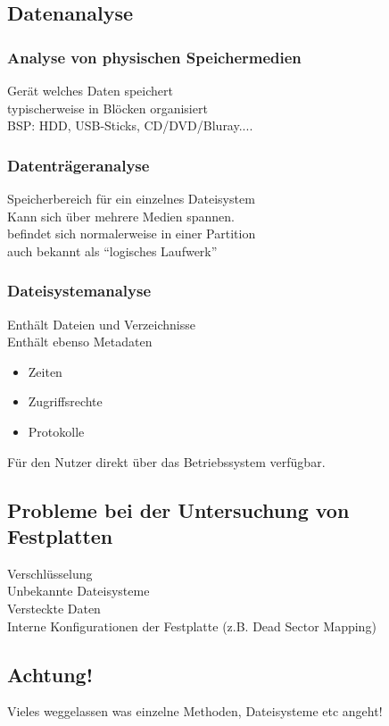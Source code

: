 \documentclass{article} %
\begin{document}
\subsection{Datenanalyse}
\subsubsection{Analyse von physischen Speichermedien}
Gerät welches Daten speichert\\
typischerweise in Blöcken organisiert\\
BSP: HDD, USB-Sticks, CD/DVD/Bluray....
\subsubsection{Datenträgeranalyse}
Speicherbereich für ein einzelnes Dateisystem\\
Kann sich über mehrere Medien spannen.\\
befindet sich normalerweise in einer Partition\\
auch bekannt als "`logisches Laufwerk"'
\subsubsection{Dateisystemanalyse}
Enthält Dateien und Verzeichnisse\\
Enthält ebenso Metadaten
\begin{itemize}
	\item Zeiten
    \item Zugriffsrechte
    \item Protokolle
\end{itemize}
Für den Nutzer direkt über das Betriebssystem verfügbar.
\subsection{Probleme bei der Untersuchung von Festplatten}
Verschlüsselung\\
Unbekannte Dateisysteme\\
Versteckte Daten\\
Interne Konfigurationen der Festplatte (z.B. Dead Sector Mapping)\\
\subsection{Achtung!}
Vieles weggelassen was einzelne Methoden, Dateisysteme etc angeht!
\end{document}
